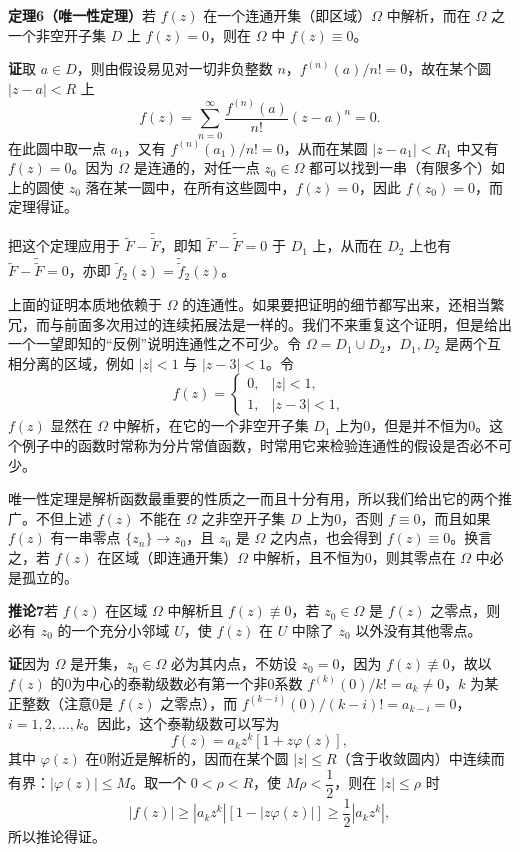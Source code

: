 \noindent\textbf{定理6（唯一性定理）}\quad 若 $f(z)$ 在一个连通开集（即区域）$\Omega$ 中解析，而在 $\Omega$ 之一个非空开子集 $D$ 上 $f(z)=0$，则在 $\Omega$ 中 $f(z)\equiv0$。

\noindent\textbf{证}\quad 取 $a\in D$，则由假设易见对一切非负整数 $n$，$f^{(n)}(a)/n!=0$，故在某个圆 $|z-a|<R$ 上
\[
 f(z)=\sum_{n=0}^{\infty}\frac{f^{(n)}(a)}{n!}(z-a)^n=0.
\]
在此圆中取一点 $a_1$，又有 $f^{(n)}(a_1)/n!=0$，从而在某圆 $|z-a_1|<R_1$ 中又有 $f(z)=0$。因为 $\Omega$ 是连通的，对任一点 $z_0\in\Omega$ 都可以找到一串（有限多个）如上的圆使 $z_0$ 落在某一圆中，在所有这些圆中，$f(z)=0$，因此 $f(z_0)=0$，而定理得证。

把这个定理应用于 $\widetilde F-\widetilde{\widetilde F}$，即知 $\widetilde F-\widetilde{\widetilde F}=0$ 于 $D_1$ 上，从而在 $D_2$ 上也有 $\widetilde F-\widetilde{\widetilde F}=0$，亦即 $\widetilde f_2(z)=\widetilde{\widetilde f}_2(z)$。

上面的证明本质地依赖于 $\Omega$ 的连通性。如果要把证明的细节都写出来，还相当繁冗，而与前面多次用过的连续拓展法是一样的。我们不来重复这个证明，但是给出一个一望即知的“反例”说明连通性之不可少。令 $\Omega=D_1\cup D_2$，$D_1,D_2$ 是两个互相分离的区域，例如 $|z|<1$ 与 $|z-3|<1$。令
\[
 f(z)=
 \begin{cases}
 0,&|z|<1,\\
 1,&|z-3|<1,
 \end{cases}
\]
$f(z)$ 显然在 $\Omega$ 中解析，在它的一个非空开子集 $D_1$ 上为0，但是并不恒为0。这个例子中的函数时常称为分片常值函数，时常用它来检验连通性的假设是否必不可少。

唯一性定理是解析函数最重要的性质之一而且十分有用，所以我们给出它的两个推广。不但上述 $f(z)$ 不能在 $\Omega$ 之非空开子集 $D$ 上为0，否则 $f\equiv0$，而且如果 $f(z)$ 有一串零点 $\{z_n\}\to z_0$，且 $z_0$ 是 $\Omega$ 之内点，也会得到 $f(z)\equiv0$。换言之，若 $f(z)$ 在区域（即连通开集）$\Omega$ 中解析，且不恒为0，则其零点在 $\Omega$ 中必是孤立的。

\noindent\textbf{推论7}\quad 若 $f(z)$ 在区域 $\Omega$ 中解析且 $f(z)\not\equiv0$，若 $z_0\in\Omega$ 是 $f(z)$ 之零点，则必有 $z_0$ 的一个充分小邻域 $U$，使 $f(z)$ 在 $U$ 中除了 $z_0$ 以外没有其他零点。

\noindent\textbf{证}\quad 因为 $\Omega$ 是开集，$z_0\in\Omega$ 必为其内点，不妨设 $z_0=0$，因为 $f(z)\not\equiv0$，故以 $f(z)$ 的0为中心的泰勒级数必有第一个非0系数 $f^{(k)}(0)/k!=a_k\ne0$，$k$ 为某正整数（注意0是 $f(z)$ 之零点），而 $f^{(k-i)}(0)/(k-i)!=a_{k-i}=0$，$i=1,2,\ldots,k$。因此，这个泰勒级数可以写为
\[
 f(z)=a_kz^k[1+z\varphi(z)],
\]
其中 $\varphi(z)$ 在0附近是解析的，因而在某个圆 $|z|\le R$（含于收敛圆内）中连续而有界：$|\varphi(z)|\le M$。取一个 $0<\rho<R$，使 $M\rho<\dfrac12$，则在 $|z|\le\rho$ 时
\[
 |f(z)|\ge|a_kz^k|[1-|z\varphi(z)|]\ge\frac12|a_kz^k|,
\]
所以推论得证。

